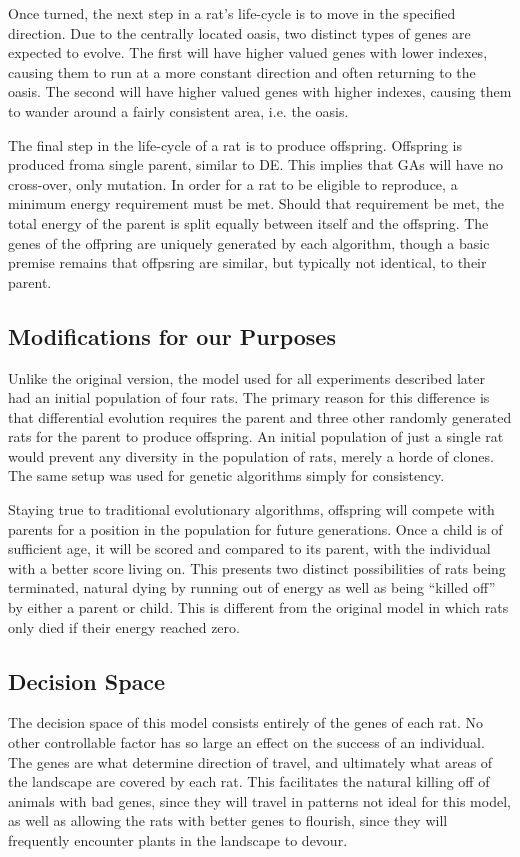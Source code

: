 \documentclass{sig-alternate}
\begin{document}
Once turned, the next step in a rat's life-cycle is to move in the specified direction.  Due to the centrally located oasis, two distinct types of genes are expected to evolve.  The first will have higher valued genes with lower indexes, causing them to run at a more constant direction and often returning to the oasis.  The second will have higher valued genes with higher indexes, causing them to wander around a fairly consistent area, i.e. the oasis.  

The final step in the life-cycle of a rat is to produce offspring.  Offspring is produced froma single parent, similar to DE.  This implies that GAs will have no cross-over, only mutation.  In order for a rat to be eligible to reproduce, a minimum energy requirement must be met.  Should that requirement be met, the total energy of the parent is split equally between itself and the offspring.  The genes of the offpring are uniquely generated by each algorithm, though a basic premise remains that offpsring are similar, but typically not identical, to their parent.

\subsection{Modifications for our Purposes}
Unlike the original version, the model used for all experiments described later had an initial population of four rats.  The primary reason for this difference is that differential evolution requires the parent and three other randomly generated rats for the parent to produce offspring.  An initial population of just a single rat would prevent any diversity in the population of rats, merely a horde of clones.  The same setup was used for genetic algorithms simply for consistency.

Staying true to traditional evolutionary algorithms, offspring will compete with parents for a position in the population for future generations.  Once a child is of sufficient age, it will be scored and compared to its parent, with the individual with a better score living on.  This presents two distinct possibilities of rats being terminated, natural dying by running out of energy as well as being ``killed off'' by either a parent or child.  This is different from the original model in which rats only died if their energy reached zero.  

\subsection{Decision Space}
The decision space of this model consists entirely of the genes of each rat.  No other controllable factor has so large an effect on the success of an individual.  The genes are what determine direction of travel, and ultimately what areas of the landscape are covered by each rat.  This facilitates the natural killing off of animals with bad genes, since they will travel in patterns not ideal for this model, as well as allowing the rats with better genes to flourish, since they will frequently encounter plants in the landscape to devour.
\end{document}
